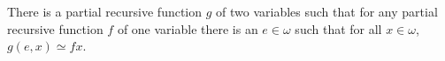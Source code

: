 There is a partial recursive function $g$ of two variables such that for any partial recursive function $f$ of one variable there is an $e \in \omega$ such that for all $x \in \omega$, $g(e, x) \simeq fx$.
